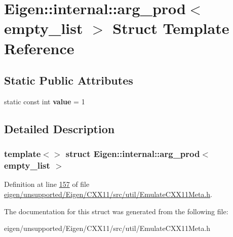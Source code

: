 \hypertarget{struct_eigen_1_1internal_1_1arg__prod_3_01empty__list_01_4}{}\section{Eigen\+:\+:internal\+:\+:arg\+\_\+prod$<$ empty\+\_\+list $>$ Struct Template Reference}
\label{struct_eigen_1_1internal_1_1arg__prod_3_01empty__list_01_4}
\subsection*{Static Public Attributes}
\begin{DoxyCompactItemize}
\item 
\mbox{\label{struct_eigen_1_1internal_1_1arg__prod_3_01empty__list_01_4_af53b882e248668bce80f8fb946ad17d9}} 
static const int {\bfseries value} = 1
\end{DoxyCompactItemize}


\subsection{Detailed Description}
\subsubsection*{template$<$$>$\newline
struct Eigen\+::internal\+::arg\+\_\+prod$<$ empty\+\_\+list $>$}



Definition at line \hyperlink{eigen_2unsupported_2_eigen_2_c_x_x11_2src_2util_2_emulate_c_x_x11_meta_8h_source_l00157}{157} of file \hyperlink{eigen_2unsupported_2_eigen_2_c_x_x11_2src_2util_2_emulate_c_x_x11_meta_8h_source}{eigen/unsupported/\+Eigen/\+C\+X\+X11/src/util/\+Emulate\+C\+X\+X11\+Meta.\+h}.



The documentation for this struct was generated from the following file\+:\begin{DoxyCompactItemize}
\item 
eigen/unsupported/\+Eigen/\+C\+X\+X11/src/util/\+Emulate\+C\+X\+X11\+Meta.\+h\end{DoxyCompactItemize}
